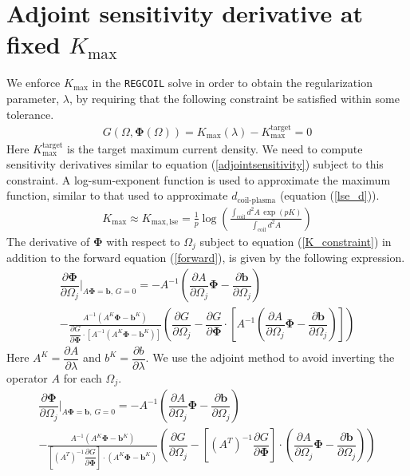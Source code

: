 \documentclass[aps,unsortedaddress]{revtex4-1}
\newcommand{\partder}[2]{\dfrac{\partial  #1}{\partial  #2}}
\begin{document}
\section{Adjoint sensitivity derivative at fixed $K_{\text{max}}$}
\label{lambda_search}
We enforce $K_{\text{max}}$ in the \texttt{REGCOIL} solve in order to obtain the regularization parameter, $\lambda$, by requiring that the following constraint be satisfied within some tolerance. 
\begin{gather}
G(\Omega, \bm{\Phi}(\Omega)) = K_{\text{max}}(\lambda) - K^{\text{target}}_{\text{max}}  = 0 
\label{K_constraint}
\end{gather}
Here $K^{\text{target}}_{\text{max}}$ is the target maximum current density. We need to compute sensitivity derivatives similar to equation (\ref{adjointsensitivity}) subject to this constraint. A log-sum-exponent function is used to approximate the maximum function, similar to that used to approximate $d_{\text{coil-plasma}}$ (equation (\ref{lse_d})).
\begin{gather}
K_{\text{max}} \approx K_{\text{max},\, \text{lse}} =  \frac{1}{p} \log \left( \frac{\int_{\text{coil}} d^2 A \,  \exp\left(p K\right)}{ \int_{\text{coil}} d^2 A } \right)
\end{gather}
The derivative of $\bm{\Phi}$ with respect to $\Omega_j$ subject to equation (\ref{K_constraint}) in addition to the forward equation (\ref{forward}), is given by the following expression. 
\begin{multline}
\partder{\bm{\Phi}}{\Omega_j} \bigg \rvert_{A \bm{\Phi} = \bm{b}, \, G = 0} = - A^{-1} \left( \partder{A}{\Omega_j} \bm{\Phi} - \partder{\bm{b}}{\Omega_j} \right)\\ - \frac{A^{-1} \left( A^K \bm{\Phi} - \bm{b}^K \right) }{ \partder{G}{\bm{\Phi}} \cdot \left[ A^{-1} \left( A^K \bm{\Phi} - \bm{b}^K \right) \right] } \left( \partder{G}{\Omega_j} - \partder{G}{\bm{\Phi}} \cdot \left[ A^{-1} \left( \partder{A}{\Omega_j} \bm{\Phi} - \partder{\bm{b}}{\Omega_j} \right) \right] \right) 
\end{multline}
Here $A^K = \partder{A}{\lambda}$ and $b^K = \partder{b}{\lambda}$. We use the adjoint method to avoid inverting the operator $A$ for each $\Omega_j$.
\begin{multline}
\partder{\bm{\Phi}}{\Omega_j} \bigg \rvert_{A \bm{\Phi} = \bm{b}, \, G = 0} = - A^{-1} \left( \partder{A}{\Omega_j} \bm{\Phi} - \partder{\bm{b}}{\Omega_j} \right)\\ - \frac{A^{-1} \left( A^K \bm{\Phi} - \bm{b}^K \right) }{ \left[ \left( A^T \right)^{-1} \partder{G}{\bm{\Phi}} \right] \cdot \left( A^K \bm{\Phi} - \bm{b}^K \right) } \left( \partder{G}{\Omega_j} - \left[ \left( A^T \right)^{-1} \partder{G}{\bm{\Phi}} \right]  \cdot \left( \partder{A}{\Omega_j} \bm{\Phi} - \partder{\bm{b}}{\Omega_j} \right) \right) 
\label{withadjoint}
\end{multline}
\end{document}
